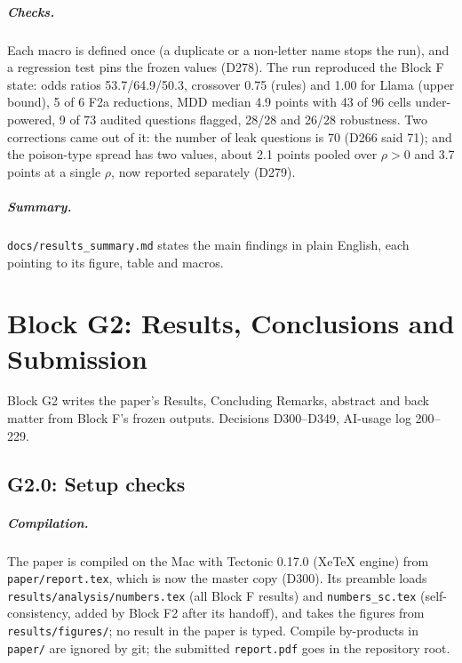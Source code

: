 \documentclass[11pt,a4paper]{report}
\begin{document}
\paragraph{Checks.} Each macro is defined once (a duplicate or a non-letter name stops the run), and a regression test pins the frozen values (D278). The run reproduced the Block F state: odds ratios 53.7/64.9/50.3, crossover 0.75 (rules) and 1.00 for Llama (upper bound), 5 of 6 F2a reductions, MDD median 4.9 points with 43 of 96 cells under-powered, 9 of 73 audited questions flagged, 28/28 and 26/28 robustness. Two corrections came out of it: the number of leak questions is 70 (D266 said 71); and the poison-type spread has two values, about 2.1 points pooled over $\rho>0$ and 3.7 points at a single $\rho$, now reported separately (D279).

\paragraph{Summary.} \texttt{docs/results\_summary.md} states the main findings in plain English, each pointing to its figure, table and macros.

\chapter{Block G2: Results, Conclusions and Submission}\label{ch:blockG2}

Block G2 writes the paper's Results, Concluding Remarks, abstract and back matter from Block F's frozen
outputs. Decisions D300--D349, AI-usage log 200--229.

\section{G2.0: Setup checks}

\paragraph{Compilation.} The paper is compiled on the Mac with Tectonic 0.17.0 (XeTeX engine) from
\texttt{paper/report.tex}, which is now the master copy (D300). Its preamble loads
\texttt{results/analysis/numbers.tex} (all Block F results) and \texttt{numbers\_sc.tex} (self-consistency,
added by Block F2 after its handoff), and takes the figures from \texttt{results/figures/}; no result in the
paper is typed. Compile by-products in \texttt{paper/} are ignored by git; the submitted \texttt{report.pdf}
goes in the repository root.
\end{document}
